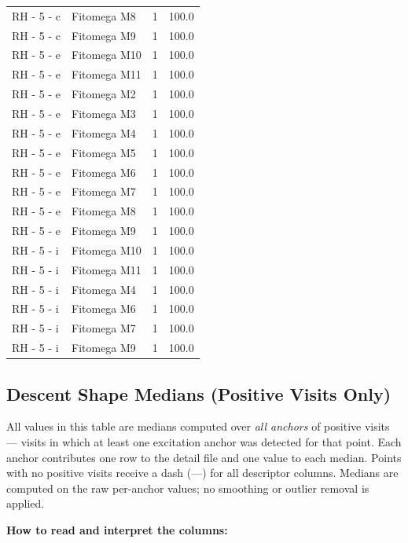 \documentclass[a4paper,11pt]{article}
\begin{document}
\begin{footnotesize}
\begin{longtable}{p{3.5cm}p{7.5cm}rr}
RH - 5 - c & Fitomega M8 & 1 & 100.0 \\
RH - 5 - c & Fitomega M9 & 1 & 100.0 \\
RH - 5 - e & Fitomega M10 & 1 & 100.0 \\
RH - 5 - e & Fitomega M11 & 1 & 100.0 \\
RH - 5 - e & Fitomega M2 & 1 & 100.0 \\
RH - 5 - e & Fitomega M3 & 1 & 100.0 \\
RH - 5 - e & Fitomega M4 & 1 & 100.0 \\
RH - 5 - e & Fitomega M5 & 1 & 100.0 \\
RH - 5 - e & Fitomega M6 & 1 & 100.0 \\
RH - 5 - e & Fitomega M7 & 1 & 100.0 \\
RH - 5 - e & Fitomega M8 & 1 & 100.0 \\
RH - 5 - e & Fitomega M9 & 1 & 100.0 \\
RH - 5 - i & Fitomega M10 & 1 & 100.0 \\
RH - 5 - i & Fitomega M11 & 1 & 100.0 \\
RH - 5 - i & Fitomega M4 & 1 & 100.0 \\
RH - 5 - i & Fitomega M6 & 1 & 100.0 \\
RH - 5 - i & Fitomega M7 & 1 & 100.0 \\
RH - 5 - i & Fitomega M9 & 1 & 100.0 \\
\end{longtable}
\end{footnotesize}

\subsection{Descent Shape Medians (Positive Visits Only)}

All values in this table are medians computed over \emph{all anchors} of positive visits ---
visits in which at least one excitation anchor was detected for that point. Each anchor
contributes one row to the detail file and one value to each median. Points with no positive
visits receive a dash (---) for all descriptor columns.
Medians are computed on the raw per-anchor values; no smoothing or outlier removal is
applied.

\medskip
\noindent\textbf{How to read and interpret the columns:}
\end{document}

